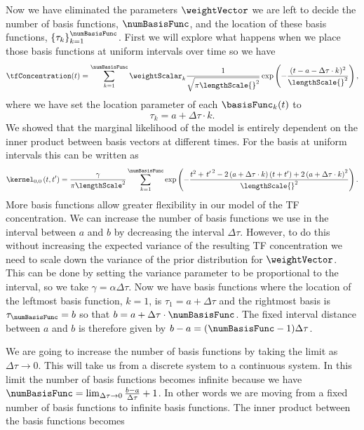 \documentclass{article}
\begin{document}
Now we have eliminated the parameters $\weightVector$ we are left to
decide the number of basis functions, $\numBasisFunc$, and the location of these basis
functions, $\left\{\tau_k\right\}_{k=1}^\numBasisFunc$. First we will explore what happens when we place those basis
functions at uniform intervals over time so we have
\[
\tfConcentration(t) = \sum_{k=1}^\numBasisFunc \weightScalar_k \frac{1}{\sqrt{\pi\lengthScale{}^2}}\exp\left(-\frac{(t-a -\Delta\tau \cdot k)^2}{\lengthScale{}^2}\right),
\]
where we have set the location parameter of each $\basisFunc_k(t)$ to
\[
\tau_k = a+\Delta\tau\cdot k.
\]
We showed that the marginal likelihood of the model is entirely
dependent on the inner product between basis vectors at different
times. For the basis at uniform intervals this can be written as
\[
\kernel_{0,0}\left(t,t^\prime\right) = \frac{\gamma}{\pi
  \lengthScale^2}\sum_{k=1}^{\numBasisFunc} \exp\left( -\frac{t^2 +
    \left.t^\prime\right.^2 - 2\left(a+\Delta\tau\cdot k\right)
    \left(t+t^\prime\right) + 2\left(a+\Delta\tau \cdot k\right)^2}{
    \lengthScale{}^2} \right).
\]
More basis functions allow greater flexibility in our model of the TF
concentration. We can increase the number of basis functions we use in
the interval between $a$ and $b$ by decreasing the interval
$\Delta\tau$. However, to do this without increasing the expected
variance of the resulting TF concentration we need to scale down the
variance of the prior distribution for $\weightVector$. This can be
done by setting the variance parameter to be proportional to the
interval, so we take $\gamma = \alpha\Delta\tau$. Now we have basis
functions where the location of the leftmost basis function, $k=1$, is
$\tau_1=a+\Delta\tau$ and the rightmost basis is
$\tau_\numBasisFunc=b$ so that $b= a+
\Delta\tau\cdot\numBasisFunc$. The fixed interval distance between $a$
and $b$ is therefore given by $b-a=(\numBasisFunc-1)\Delta \tau$.

We are going to increase the number of basis functions by taking the
limit as $\Delta \tau\rightarrow 0$. This will take us from a discrete
system to a continuous system. In this limit the number of basis
functions becomes infinite because we have $\numBasisFunc
=\lim_{\Delta \tau \rightarrow 0} \frac{b-a}{\Delta \tau} + 1$. In
other words we are moving from a fixed number of basis functions to
infinite basis functions. The inner product between the basis
functions becomes
\end{document}

